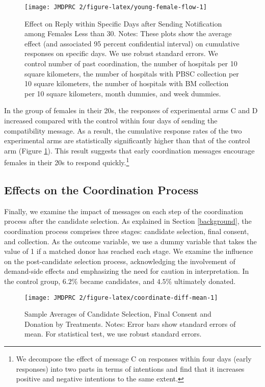 \documentclass[12pt, a4paper]{article}
\begin{document}
\begin{figure}[t]
\texttt{[image: JMDPRC~2/figure-latex/young-female-flow-1]} \caption{Effect on Reply within Specific Days after Sending Notification among Females Less than 30. Notes: These plots show the average effect (and associated 95 percent confidential interval) on cumulative responses on specific days. We use robust standard errors. We control number of past coordination, the number of hospitals per 10 square kilometers, the number of hospitals with PBSC collection per 10 square kilometers, the number of hospitals with BM collection per 10 square kilometers, month dummies, and week dummies.}\label{fig:young-female-flow}
\end{figure}

In the group of females in their 20s, the responses of experimental arms C and D increased compared with the control within four days of sending the compatibility message. As a result, the cumulative response rates of the two experimental arms are statistically significantly higher than that of the control arm (Figure \ref{fig:young-female-flow}). This result suggests that early coordination messages encourage females in their 20s to respond quickly.\footnote{We decompose the effect of message C on responses within four days (early responses) into two parts in terms of intentions and find that it increases positive and negative intentions to the same extent.}

\hypertarget{process}{%
\subsection{Effects on the Coordination Process}\label{process}}

Finally, we examine the impact of messages on each step of the coordination process after the candidate selection. As explained in Section \ref{background}, the coordination process comprises three stages: candidate selection, final consent, and collection. As the outcome variable, we use a dummy variable that takes the value of 1 if a matched donor has reached each stage. We examine the influence on the post-candidate selection process, acknowledging the involvement of demand-side effects and emphasizing the need for caution in interpretation. In the control group, \(6.2\)\% became candidates, and \(4.5\)\% ultimately donated.

\begin{figure}[t]
\texttt{[image: JMDPRC~2/figure-latex/coordinate-diff-mean-1]} \caption{Sample Averages of Candidate Selection, Final Consent and Donation by Treatments. Notes: Error bars show standard errors of mean. For statistical test, we use robust standard errors.}\label{fig:coordinate-diff-mean}
\end{figure}
\end{document}
